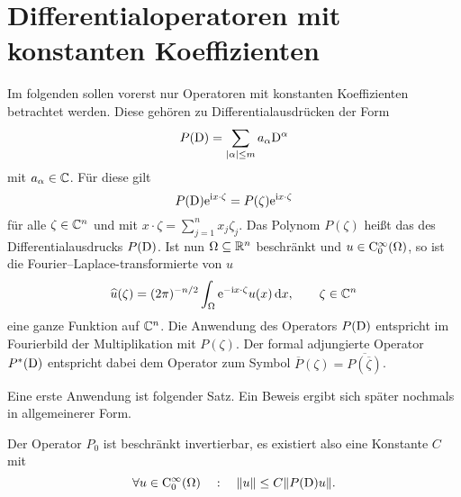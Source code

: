 \section{Differentialoperatoren mit konstanten Koeffizienten}
Im folgenden sollen vorerst nur Operatoren mit konstanten Koeffizienten betrachtet werden. Diese gehören zu Differentialausdrücken der Form
\begin{equation}
     P(\mathrm D) = \sum_{|\alpha|\le m} a_\alpha \mathrm D^\alpha
\end{equation}
mit $a_\alpha\in\mathbb C$. Für diese gilt 
\begin{equation}
     P(\mathrm D) \mathrm e^{\mathrm i x\cdot\zeta}  =  P(\zeta) \mathrm e^{\mathrm i x\cdot\zeta}
\end{equation}
für alle $\zeta\in\mathbb C^n$ und mit $x\cdot\zeta = \sum_{j=1}^n x_j\zeta_j$. Das Polynom $ P(\zeta)$ heißt das  des Differentialausdrucks $P(\mathrm D)$. Ist nun $\Omega\subseteq\mathbb R^n$ beschränkt und $u\in\mathrm C_0^\infty(\Omega)$, so ist die Fourier--Laplace-transformierte von $u$
\begin{equation}
    \widehat u (\zeta) = (2\pi)^{-n/2} \int_\Omega \mathrm e^{-\mathrm i x\cdot\zeta } u(x) \,\mathrm d x,\qquad \zeta\in\mathbb C^n
\end{equation}
eine ganze Funktion auf $\mathbb C^n$. Die Anwendung des Operators $ P(\mathrm D)$ entspricht im Fourierbild der Multiplikation mit $ P(\zeta)$. Der formal adjungierte Operator $  P^*(\mathrm D)$ entspricht dabei dem Operator zum Symbol $\overline{P}(\zeta)=\overline{P(\overline\zeta)}$.

Eine erste Anwendung ist folgender Satz. Ein Beweis ergibt sich später nochmals in allgemeinerer Form.

\begin{thm}\label{thm:1:1.8}
Der Operator $P_0$ ist beschränkt invertierbar, es existiert also eine Konstante $C$ mit
\begin{equation}
   \forall u\in\mathrm C_0^\infty(\Omega)\quad:\quad \|u\|\le C\| P(\mathrm D) u\|.
\end{equation}
\end{thm}

